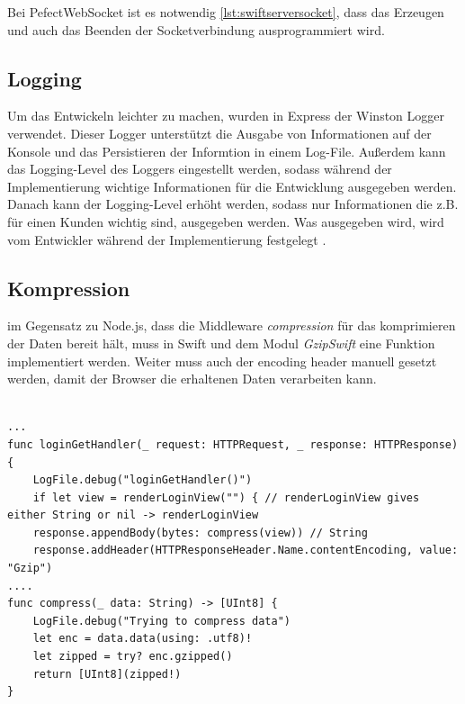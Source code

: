 Bei PefectWebSocket ist es notwendig \ref{lst:swiftserversocket}, dass das Erzeugen und auch das Beenden der Socketverbindung ausprogrammiert wird.

\subsection{Logging}
Um das Entwickeln leichter zu machen, wurden in Express der Winston Logger verwendet. Dieser Logger unterstützt die Ausgabe von Informationen auf der Konsole und das Persistieren der Informtion in einem Log-File. Außerdem kann das Logging-Level des Loggers eingestellt werden, sodass während der Implementierung wichtige Informationen für die Entwicklung ausgegeben werden. Danach kann der Logging-Level erhöht werden, sodass nur Informationen die z.B. für einen Kunden wichtig sind, ausgegeben werden. Was ausgegeben wird, wird vom Entwickler während der Implementierung festgelegt \parencite{winston}. 

\subsection{Kompression}
im Gegensatz zu Node.js, dass die Middleware \textit{compression} für das komprimieren der Daten bereit hält, muss in Swift und dem Modul \textit{GzipSwift} eine Funktion implementiert werden. Weiter muss auch der encoding header manuell gesetzt werden, damit der Browser die erhaltenen Daten verarbeiten kann.


\begin{lstlisting}

...
func loginGetHandler(_ request: HTTPRequest, _ response: HTTPResponse) {
    LogFile.debug("loginGetHandler()")
    if let view = renderLoginView("") { // renderLoginView gives either String or nil -> renderLoginView
    response.appendBody(bytes: compress(view)) // String
    response.addHeader(HTTPResponseHeader.Name.contentEncoding, value: "Gzip")
....
func compress(_ data: String) -> [UInt8] {
	LogFile.debug("Trying to compress data")
	let enc = data.data(using: .utf8)!
	let zipped = try? enc.gzipped()
	return [UInt8](zipped!)
}

\end{lstlisting}

